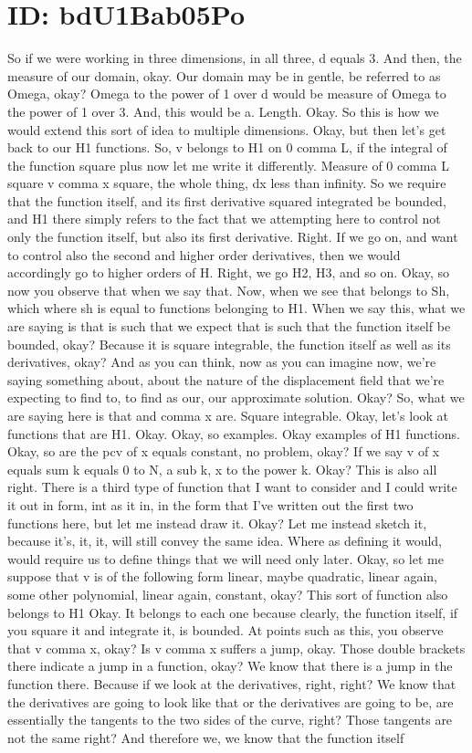 \documentclass[10pt]{article}
\begin{document}
\section*{ID: bdU1Bab05Po}
So if we were working in three dimensions, in all three, d equals 3. And then, the measure of our domain, okay. Our domain may be in gentle, be referred to as Omega, okay? Omega to the power of 1 over d would be measure of Omega to the power of 1 over 3. And, this would be a. Length. Okay. So this is how we would extend this sort of idea to multiple dimensions. Okay, but then let's get back to our H1 functions. So, v belongs to H1 on 0 comma L, if the integral of the function square plus now let me write it differently. Measure of 0 comma L square v comma x square, the whole thing, dx less than infinity. So we require that the function itself, and its first derivative squared integrated be bounded, and H1 there simply refers to the fact that we attempting here to control not only the function itself, but also its first derivative. Right. If we go on, and want to control also the second and higher order derivatives, then we would accordingly go to higher orders of H. Right, we go H2, H3, and so on. Okay, so now you observe that when we say that. Now, when we see that belongs to Sh, which where sh is equal to functions belonging to H1. When we say this, what we are saying is that is such that we expect that is such that the function itself be bounded, okay? Because it is square integrable, the function itself as well as its derivatives, okay? And as you can think, now as you can imagine now, we're saying something about, about the nature of the displacement field that we're expecting to find to, to find as our, our approximate solution. Okay? So, what we are saying here is that and comma x are. Square integrable. Okay, let's look at functions that are H1. Okay. Okay, so examples. Okay examples of H1 functions. Okay, so are the pcv of x equals constant, no problem, okay? If we say v of x equals sum k equals 0 to N, a sub k, x to the power k. Okay? This is also all right. There is a third type of function that I want to consider and I could write it out in form, int as it in, in the form that I've written out the first two functions here, but let me instead draw it. Okay? Let me instead sketch it, because it's, it, it, will still convey the same idea. Where as defining it would, would require us to define things that we will need only later. Okay, so let me suppose that v is of the following form linear, maybe quadratic, linear again, some other polynomial, linear again, constant, okay? This sort of function also belongs to H1 Okay. It belongs to each one because clearly, the function itself, if you square it and integrate it, is bounded. At points such as this, you observe that v comma x, okay? Is v comma x suffers a jump, okay. Those double brackets there indicate a jump in a function, okay? We know that there is a jump in the function there. Because if we look at the derivatives, right, right? We know that the derivatives are going to look like that or the derivatives are going to be, are essentially the tangents to the two sides of the curve, right? Those tangents are not the same right? And therefore we, we know that the function itself 
\end{document}
